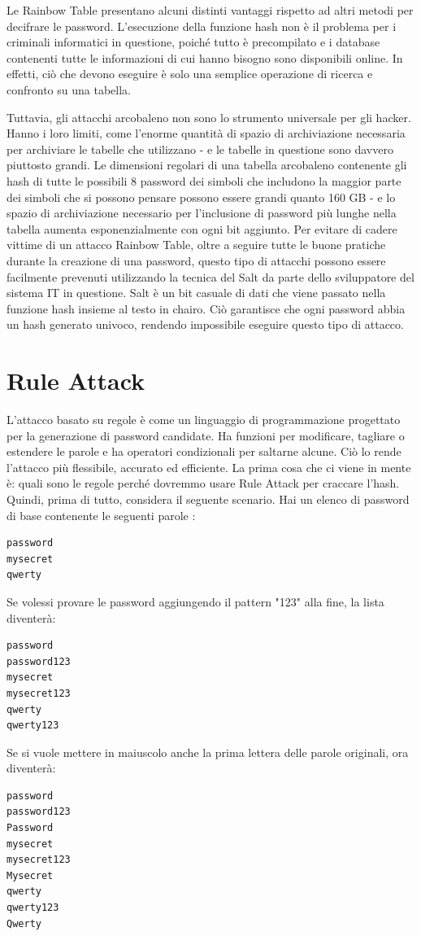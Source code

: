 Le Rainbow Table presentano alcuni distinti vantaggi rispetto ad altri metodi per decifrare le password. L'esecuzione della funzione hash non è il problema per i criminali informatici in questione, poiché tutto è precompilato e i database contenenti tutte le informazioni di cui hanno bisogno sono disponibili online. In effetti, ciò che devono eseguire è solo una semplice operazione di ricerca e confronto su una tabella.

Tuttavia, gli attacchi arcobaleno non sono lo strumento universale per gli hacker. Hanno i loro limiti, come l'enorme quantità di spazio di archiviazione necessaria per archiviare le tabelle che utilizzano - e le tabelle in questione sono davvero piuttosto grandi. Le dimensioni regolari di una tabella arcobaleno contenente gli hash di tutte le possibili 8 password dei simboli che includono la maggior parte dei simboli che si possono pensare possono essere grandi quanto 160 GB - e lo spazio di archiviazione necessario per l'inclusione di password più lunghe nella tabella aumenta esponenzialmente con ogni bit aggiunto.
Per evitare di cadere vittime di un attacco Rainbow Table, oltre a seguire tutte le buone pratiche durante la creazione di una password, questo tipo di attacchi possono essere facilmente prevenuti utilizzando la tecnica del Salt da parte dello sviluppatore del sistema IT in questione. Salt è un bit casuale di dati che viene passato nella funzione hash insieme al testo in chairo. Ciò garantisce che ogni password abbia un hash generato univoco, rendendo impossibile eseguire questo tipo di attacco.

\section{Rule Attack}
L'attacco basato su regole\cite{Rule_based} è come un linguaggio di programmazione progettato per la generazione di password candidate. Ha funzioni per modificare, tagliare o estendere le parole e ha operatori condizionali per saltarne alcune. Ciò lo rende l'attacco più flessibile, accurato ed efficiente.
La prima cosa che ci viene in mente è: quali sono le regole perché dovremmo usare Rule Attack per craccare l'hash. Quindi, prima di tutto, considera il seguente scenario. Hai un elenco di password di base contenente le seguenti parole :

\begin{lstlisting}[caption={Esempio rule attack wordlist}, style=javaScriptCode]
password
mysecret
qwerty
\end{lstlisting}
Se volessi provare le password aggiungendo il pattern "123" alla fine, la lista diventerà:
\begin{lstlisting}[caption={Esempio rule attack wordlist}, style=javaScriptCode]
password
password123
mysecret
mysecret123
qwerty
qwerty123
\end{lstlisting}
Se si vuole mettere in maiuscolo anche la prima lettera delle parole originali, ora diventerà:
\begin{lstlisting}[caption={Esempio rule attack wordlist}, style=javaScriptCode]
password
password123
Password
mysecret
mysecret123
Mysecret
qwerty
qwerty123
Qwerty
\end{lstlisting}

